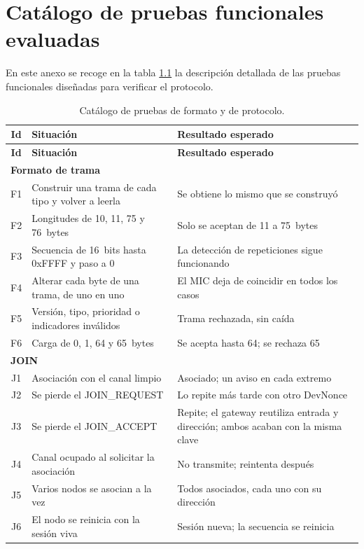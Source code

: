 \chapter{Catálogo de pruebas funcionales evaluadas}\label{anexo_A}
En este anexo se recoge en la tabla \ref{tab:catalogo} la descripción detallada de las pruebas funcionales diseñadas para verificar el protocolo.

{\small
\begin{longtable}{|c|p{6.4cm}|p{6.8cm}|}
\caption{\label{tab:catalogo} Catálogo de pruebas de formato y de protocolo.}\\
\hline
\textbf{Id} & \textbf{Situación} & \textbf{Resultado esperado} \\
\hline
\endfirsthead
\hline
\textbf{Id} & \textbf{Situación} & \textbf{Resultado esperado} \\
\hline
\endhead
\multicolumn{3}{|l|}{\textbf{Formato de trama}} \\
\hline
F1 & Construir una trama de cada tipo y volver a leerla & Se obtiene lo mismo que se construyó \\
\hline
F2 & Longitudes de 10, 11, 75 y 76~bytes & Solo se aceptan de 11 a 75~bytes \\
\hline
F3 & Secuencia de 16~bits hasta 0xFFFF y paso a 0 & La detección de repeticiones sigue funcionando \\
\hline
F4 & Alterar cada byte de una trama, de uno en uno & El MIC deja de coincidir en todos los casos \\
\hline
F5 & Versión, tipo, prioridad o indicadores inválidos & Trama rechazada, sin caída \\
\hline
F6 & Carga de 0, 1, 64 y 65~bytes & Se acepta hasta 64; se rechaza 65 \\
\hline
\multicolumn{3}{|l|}{\textbf{JOIN}} \\
\hline
J1 & Asociación con el canal limpio & Asociado; un aviso en cada extremo \\
\hline
J2 & Se pierde el JOIN\_REQUEST & Lo repite más tarde con otro DevNonce \\
\hline
J3 & Se pierde el JOIN\_ACCEPT & Repite; el gateway reutiliza entrada y dirección; ambos acaban con la misma clave \\
\hline
J4 & Canal ocupado al solicitar la asociación & No transmite; reintenta después \\
\hline
J5 & Varios nodos se asocian a la vez & Todos asociados, cada uno con su dirección \\
\hline
J6 & El nodo se reinicia con la sesión viva & Sesión nueva; la secuencia se reinicia \\

\end{longtable}}
